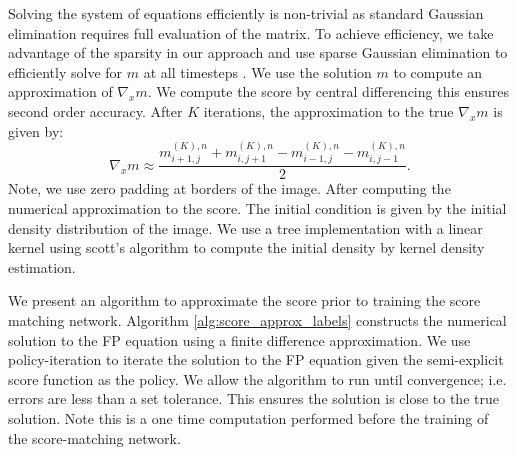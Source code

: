 \documentclass[]{interact}
\theoremstyle{plain}%
\theoremstyle{definition}
\theoremstyle{remark}
\begin{document}

Solving the system of equations efficiently is non-trivial as standard Gaussian elimination requires full evaluation of the matrix. To achieve efficiency, we take advantage of the sparsity in our approach and use sparse Gaussian elimination to efficiently solve for $m$ at all timesteps \cite{saad-2003}. We use the solution $m$ to compute an approximation of $\nabla_x m$. We compute the score by central differencing this ensures second order accuracy. After $K$ iterations, the approximation to the true $\nabla_x m$ is given by:
\begin{equation}
    \nabla_x m \approx \frac{m^{(K),n}_{i+1,j} + m^{(K),n}_{i,j+1} - m^{(K),n}_{i-1,j} - m^{(K),n}_{i,j-1}}{2}.
\end{equation}
Note, we use zero padding at borders of the image. After computing the numerical approximation to the score. The initial condition is given by the initial density distribution of the image. We use a tree implementation with a linear kernel using scott's algorithm to compute the initial density by kernel density estimation.

We present an algorithm to approximate the score prior to training the score matching network. Algorithm \ref{alg:score_approx_labels} constructs the numerical solution to the FP equation using a finite difference approximation. We use policy-iteration to iterate the solution to the FP equation given the semi-explicit score function as the policy. We allow the algorithm to run until convergence; i.e. errors are less than a set tolerance. This ensures the solution is close to the true solution. Note this is a one time computation performed before the training of the score-matching network.
\end{document}
